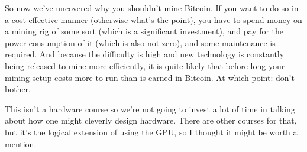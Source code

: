 So now we've uncovered why you shouldn't mine Bitcoin. If you want to do so in a cost-effective manner (otherwise what's the point), you have to spend money on a mining rig of some sort (which is a significant investment), and pay for the power consumption of it (which is also not zero), and some maintenance is required. And because the difficulty is high and new technology is constantly being released to mine more efficiently, it is quite likely that before long your mining setup costs more to run than is earned in Bitcoin. At which point: don't bother.

This isn't a hardware course so we're not going to invest a lot of time in talking about how one might cleverly design hardware. There are other courses for that, but it's the logical extension of using the GPU, so I thought it might be worth a mention.





